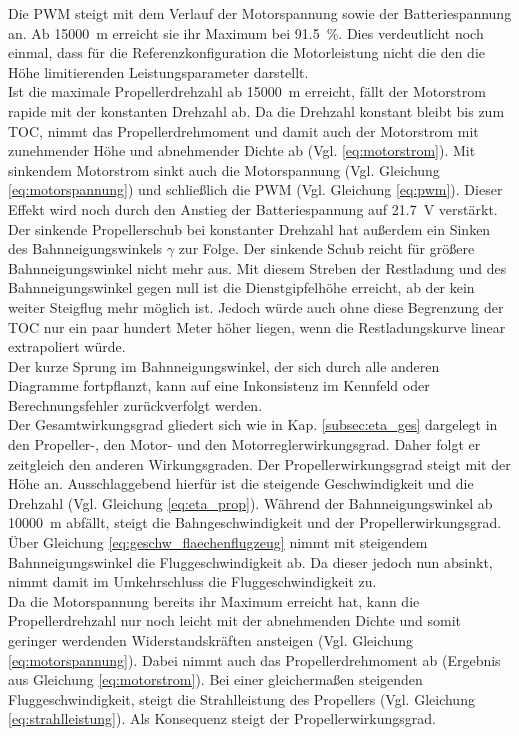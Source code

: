 Die PWM steigt mit dem Verlauf der Motorspannung sowie der Batteriespannung an. Ab \SI{15000}{m} erreicht sie ihr Maximum bei \SI{91,5}{\%}. Dies verdeutlicht noch einmal, dass für die Referenzkonfiguration die Motorleistung nicht die den die Höhe limitierenden Leistungsparameter darstellt. \\
Ist die maximale Propellerdrehzahl ab \SI{15000}{m} erreicht, fällt der Motorstrom rapide mit der konstanten Drehzahl ab. Da die Drehzahl konstant bleibt bis zum TOC, nimmt das Propellerdrehmoment und damit auch der Motorstrom mit zunehmender Höhe und abnehmender Dichte ab (Vgl. \ref{eq:motorstrom}). Mit sinkendem Motorstrom sinkt auch die Motorspannung  (Vgl. Gleichung \ref{eq:motorspannung}) und schließlich die PWM (Vgl. Gleichung \ref{eq:pwm}). Dieser Effekt wird noch durch den Anstieg der Batteriespannung auf \SI{21.7}{V} verstärkt. Der sinkende Propellerschub bei konstanter Drehzahl hat außerdem ein Sinken des Bahnneigungswinkels \ensuremath{\gamma} zur Folge. Der sinkende Schub reicht für größere Bahnneigungswinkel nicht mehr aus. Mit diesem Streben der Restladung und des Bahnneigungswinkel gegen null ist die Dienstgipfelhöhe erreicht, ab der kein weiter Steigflug mehr möglich ist. Jedoch würde auch ohne diese Begrenzung der TOC nur ein paar hundert Meter höher liegen, wenn die Restladungskurve linear extrapoliert würde. \\
Der kurze Sprung im Bahnneigungswinkel, der sich durch alle anderen Diagramme fortpflanzt, kann auf eine Inkonsistenz im Kennfeld oder Berechnungsfehler zurückverfolgt werden.\\
Der Gesamtwirkungsgrad gliedert sich wie in Kap. \ref{subsec:eta_ges} dargelegt in den Propeller-, den Motor- und den Motorreglerwirkungsgrad. Daher folgt er zeitgleich den anderen Wirkungsgraden. Der Propellerwirkungsgrad steigt mit der Höhe an. Ausschlaggebend hierfür ist die steigende Geschwindigkeit und die Drehzahl (Vgl. Gleichung \ref{eq:eta_prop}). Während der Bahnneigungswinkel ab \SI{10000}{m} abfällt, steigt die Bahngeschwindigkeit und der Propellerwirkungsgrad. Über Gleichung \ref{eq:geschw_flaechenflugzeug} nimmt mit steigendem Bahnneigungswinkel die Fluggeschwindigkeit ab. Da dieser jedoch nun absinkt, nimmt damit im Umkehrschluss die Fluggeschwindigkeit zu. \\
Da die Motorspannung bereits ihr Maximum erreicht hat, kann die Propellerdrehzahl nur noch leicht mit der abnehmenden Dichte und somit geringer werdenden Widerstandskräften ansteigen (Vgl. Gleichung \ref{eq:motorspannung}). Dabei nimmt auch das Propellerdrehmoment ab (Ergebnis aus Gleichung \ref{eq:motorstrom}). Bei einer gleichermaßen steigenden Fluggeschwindigkeit, steigt die Strahlleistung des Propellers (Vgl. Gleichung \ref{eq:strahlleistung}). Als Konsequenz steigt der Propellerwirkungsgrad.
